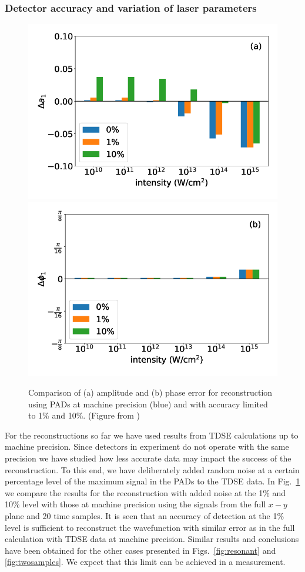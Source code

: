 \subsubsection{Detector accuracy and variation of laser parameters}

\begin{figure}[!ht]
\centering
\includegraphics[width=0.49\linewidth]{figs/Photo_ionization/superpositions/Venzke_new_fig_8a.png}
\includegraphics[width=0.49\linewidth]{figs/Photo_ionization/superpositions/Venzke_new_fig_8b.png}
\caption{
Comparison of (a) amplitude and (b) phase error for reconstruction using PADs at machine precision (blue) and with accuracy limited to 1\% and 10\%. (Figure from \cite{venzke2021_wave})
}
  \label{fig:detector}
\end{figure}

For the reconstructions so far
we have used results from TDSE calculations up to machine precision. Since detectors in experiment do not operate with the same precision we have studied how less accurate data may impact the success of the reconstruction. To this end, we have deliberately added random noise at a certain percentage level of the maximum signal in the PADs to the TDSE data. In Fig.\ \ref{fig:detector} we compare the results for the reconstruction with added noise at the  1\% and  10\% level with those at machine precision using the signals from the full $x-y$ plane and 20 time samples. It is seen that an accuracy of detection at the 1\% level is sufficient to reconstruct the wavefunction with similar error as in the full calculation with TDSE data at machine precision. Similar results and conclusions have been obtained for the other cases presented in Figs.\ \ref{fig:resonant} and \ref{fig:twosamples}. We expect that this limit can be achieved in a measurement.

